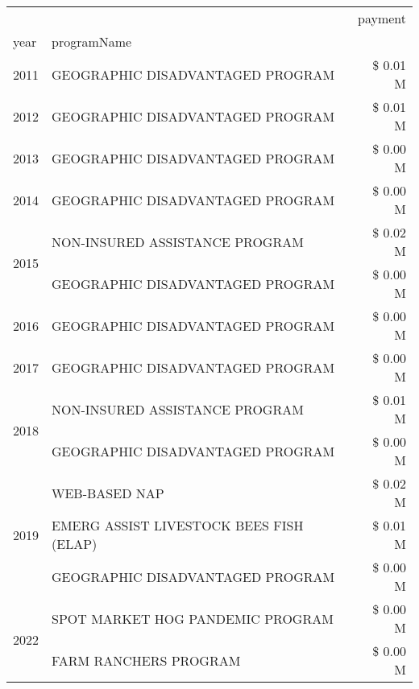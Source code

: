 \begin{tabular}{llr}
\toprule
 &  & payment \\
year & programName &  \\
\midrule
2011 & GEOGRAPHIC DISADVANTAGED PROGRAM & \$ 0.01 M \\
\cline{1-3}
2012 & GEOGRAPHIC DISADVANTAGED PROGRAM & \$ 0.01 M \\
\cline{1-3}
2013 & GEOGRAPHIC DISADVANTAGED PROGRAM & \$ 0.00 M \\
\cline{1-3}
2014 & GEOGRAPHIC DISADVANTAGED PROGRAM & \$ 0.00 M \\
\cline{1-3}
\multirow[t]{2}{*}{2015} & NON-INSURED ASSISTANCE PROGRAM & \$ 0.02 M \\
 & GEOGRAPHIC DISADVANTAGED PROGRAM & \$ 0.00 M \\
\cline{1-3}
2016 & GEOGRAPHIC DISADVANTAGED PROGRAM & \$ 0.00 M \\
\cline{1-3}
2017 & GEOGRAPHIC DISADVANTAGED PROGRAM & \$ 0.00 M \\
\cline{1-3}
\multirow[t]{2}{*}{2018} & NON-INSURED ASSISTANCE PROGRAM & \$ 0.01 M \\
 & GEOGRAPHIC DISADVANTAGED PROGRAM & \$ 0.00 M \\
\cline{1-3}
\multirow[t]{3}{*}{2019} & WEB-BASED NAP & \$ 0.02 M \\
 & EMERG ASSIST LIVESTOCK BEES FISH (ELAP) & \$ 0.01 M \\
 & GEOGRAPHIC DISADVANTAGED PROGRAM & \$ 0.00 M \\
\cline{1-3}
\multirow[t]{2}{*}{2022} & SPOT MARKET HOG PANDEMIC PROGRAM & \$ 0.00 M \\
 & FARM RANCHERS PROGRAM & \$ 0.00 M \\
\cline{1-3}
\bottomrule
\end{tabular}
